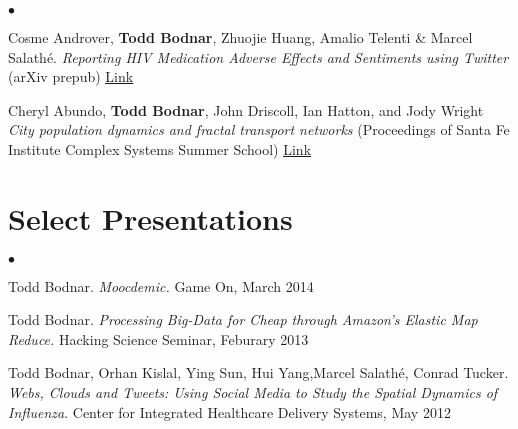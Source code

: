 \documentclass[margin,line]{res}
\newcommand{\linkToUrl}[1]{{\color{blue}\underline{\href{#1}{Link}}}}
\newenvironment{list2}{
  \begin{list}{$\bullet$}{%
      \setlength{\itemsep}{0in}
      \setlength{\parsep}{0in} \setlength{\parskip}{0in}
      \setlength{\topsep}{0in} \setlength{\partopsep}{0in} 
      \setlength{\leftmargin}{10pt}}}{\end{list}}
\begin{document}
\begin{resume}
\begin{list2}
\item Cosme Androver, \textbf{Todd Bodnar}, Zhuojie Huang, Amalio Telenti
 \& Marcel Salath\'e. \textit{Reporting HIV Medication Adverse Effects and Sentiments using Twitter} (arXiv prepub) \linkToUrl{http://arxiv.org/abs/1404.3610}
\item Cheryl Abundo, \textbf{Todd Bodnar}, John Driscoll, Ian Hatton, and Jody Wright
 \textit{City population dynamics and fractal transport networks} (Proceedings of Santa Fe Institute Complex Systems Summer School) \linkToUrl{bit.ly/19A22vY}%
\end{list2}


\section{\sc Select Presentations}
\begin{list2}
\item Todd Bodnar. \textit{Moocdemic.} Game On, March 2014
\item Todd Bodnar. \textit{Processing Big-Data for Cheap through Amazon's Elastic Map Reduce.} Hacking Science Seminar, Feburary 2013
\item Todd Bodnar, Orhan Kislal, Ying Sun, Hui Yang,Marcel Salath\'e, Conrad 
Tucker. \textit{Webs, Clouds and Tweets: Using Social Media to Study the Spatial Dynamics of Influenza}. Center for Integrated Healthcare Delivery Systems, May 2012 
\end{list2}


\end{resume}
\end{document}

